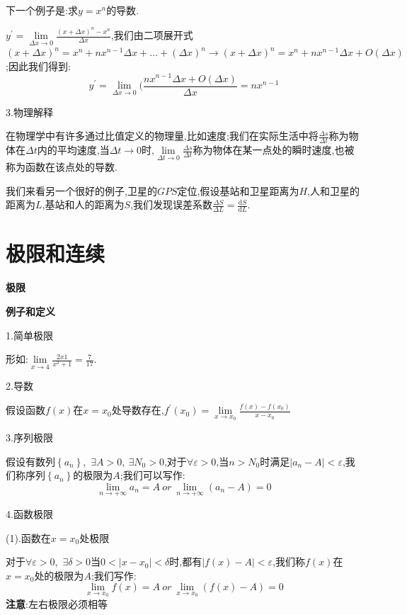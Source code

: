 \documentclass[oneside]{book}
\begin{document}
	\hspace{\fill}\
	
	下一个例子是:求$y=x^{n}$的导数.
	
	$y^{'}=\lim\limits_{\Delta x\rightarrow 0}\frac{(x+\Delta x)^{n}-x^{n}}{\Delta x}$,我们由二项展开式$(x+\Delta x)^{n}=x^{n}+nx^{n-1}\Delta x+...+(\Delta x)^{n}\rightarrow (x+\Delta x)^{n}=x^{n}+nx^{n-1}\Delta x+O(\Delta x)$;因此我们得到:$$y^{'}=\lim\limits_{\Delta x\rightarrow 0}(\frac{nx^{n-1}\Delta x+O(\Delta x)}{\Delta x}=nx^{n-1}$$
	
	3.物理解释
	
	在物理学中有许多通过比值定义的物理量,比如速度;我们在实际生活中将$\frac{\Delta s}{\Delta t}$称为物体在$\Delta t$内的平均速度,当$\Delta t\rightarrow 0$时,$\lim\limits_{\Delta t\rightarrow 0}\frac{\Delta s}{\Delta t}$称为物体在某一点处的瞬时速度,也被称为函数在该点处的导数.
	
	我们来看另一个很好的例子,卫星的$GPS$定位,假设基站和卫星距离为$H$,人和卫星的距离为$L$,基站和人的距离为$S$,我们发现误差系数$\frac{\Delta S}{\Delta L}=\frac{\mathrm{d}S}{\mathrm{d}L}$.
	
	\chapter{极限和连续}
	
	\centerline{{\large \textbf{极限}}}
	
	\textbf{例子和定义}
	
	1.简单极限
	
	形如:$\lim\limits_{x\rightarrow 4}\frac{2x1}{x^{2}+1}=\frac{7}{17}$.
	
	2.导数
	
	假设函数$f(x)$在$x=x_{0}$处导数存在,$f^{'}(x_{0})=\lim\limits_{x\rightarrow x_{0}}\frac{f(x)-f(x_{0})}{x-x_{0}}$
	
	3.序列极限
	
	假设有数列$\left\lbrace a_{n}\right\rbrace$,\ $\exists A >0,\ \exists N_{0}>0$,对于$\forall \varepsilon >0$,当$n>N_{0}$时满足$|a_{n}-A|<\varepsilon$,我们称序列$\left\lbrace a_{n} \right\rbrace $的极限为$A$;我们可以写作:
	$$\lim\limits_{n\rightarrow +\infty}a_{n}=A\ or\ \lim\limits_{n\rightarrow +\infty}(a_{n}-A)=0 $$ 
	
	4.函数极限
	
	(1).函数在$x=x_{0}$处极限
	
	对于$\forall\varepsilon >0$,\ $\exists\delta>0$当$0<|x-x_{0}|<\delta$时,都有$|f(x)-A|<\varepsilon$,我们称$f(x)$在$x=x_{0}$处的极限为$A$;我们写作:
	$$\lim\limits_{x\rightarrow x_{0}}f(x)=A\ or\ \lim\limits_{x\rightarrow x_{0}}(f(x)-A)=0$$ 
	\textbf{注意}:左右极限必须相等
	
\end{document}
